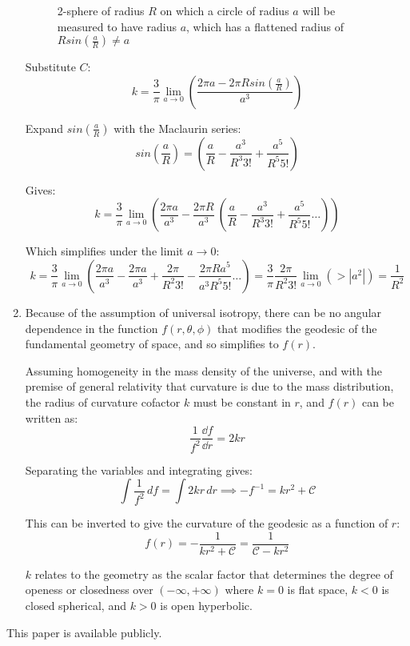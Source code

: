 \documentclass{paper}
\begin{document}
\begin{enumerate}
\begin{figure}
        \caption{2-sphere of radius \(R\) on which a circle of radius \(a\) 
          will be measured to have radius \(a\), which has a flattened radius 
          of \(R sin \left( \frac{a}{R} \right) \neq a\)}
        \label{fig:sphere}
     \end{figure}

     Substitute \(C\):
       \[ k = \frac{3}{\pi} \lim_{a \to 0} \left( \frac{2 \pi a - 
         2 \pi R sin \left(\frac{a}{R}\right)}{a^3} \right) \]

     Expand \(sin \left(\frac{a}{R}\right)\) with the Maclaurin series:
       \[ sin \left(\frac{a}{R}\right) = \left( \frac{a}{R} 
         - \frac{a^3}{R^3 3!} + \frac{a^5}{R^5 5!} \right) \]

     Gives:
      \[ k = \frac{3}{\pi} \lim_{a \to 0} \left( \frac{2 \pi a}{a^3} - 
        \frac{2 \pi R}{a^3}\ \left( \frac{a}{R} - \frac{a^3}{R^3 3!} +
        \frac{a^5}{R^5 5!} \ldots \right) \right)\]

     Which simplifies under the limit \(a \to 0\):
      \[ k = \frac{3}{\pi} \lim_{a \to 0} \left( \frac{2 \pi a}{a^3} - 
        \frac{2 \pi a}{a^3} + \frac{2 \pi }{R^2 3!} - 
        \frac{2 \pi R a^5}{a^3 R^5 5!} \ldots \right) 
        = \frac{3}{\pi} \frac{2 \pi}{R^2 3!} \lim_{a \to 0}
        \left( > |a^2| \right) = \frac{1}{R^2} \]

   \item %
     Because of the assumption of universal isotropy, there can be no angular
     dependence in the function \(f{(r,\theta,\phi)}\) that modifies the 
     geodesic of the fundamental geometry of space, and so simplifies to 
     \(f{(r)}\).

     Assuming homogeneity in the mass density of the universe, and with the 
     premise of general relativity that curvature is due to the mass 
     distribution, the radius of curvature cofactor \(k\) must be constant 
     in \(r\), and \(f{(r)}\) can be written as:
     \[ \frac{1}{f^2} \frac{\dd{f}}{\dd{r}} = 2 k r \]

     Separating the variables and integrating gives:
     \[ \int \frac{1}{f^2} \,df = \int 2 k r \, dr  \implies 
       - f^{-1} = k r^2 + \mathcal{C} \]

     This can be inverted to give the curvature of the geodesic as a function
     of \(r\):
     \begin{equation}
       f{(r)} = - \frac{1}{k r^2 + \mathcal{C}} 
       = \frac{1}{\mathcal{C} - k r^2}
       \label{eqn:f_r}
     \end{equation}

     \(k\) relates to the geometry as the scalar factor that determines the
     degree of openess or closedness over \(\left( -\infty ,+\infty \right)\)
     where \( k = 0 \) is flat space, \( k < 0 \) is closed spherical, and
     \( k > 0 \) is open hyperbolic.

\end{enumerate}

This paper is available publicly.\cite{Hayden_Cosmology_Source_Repo}

\pagebreak
\printbibliography
\end{document}
